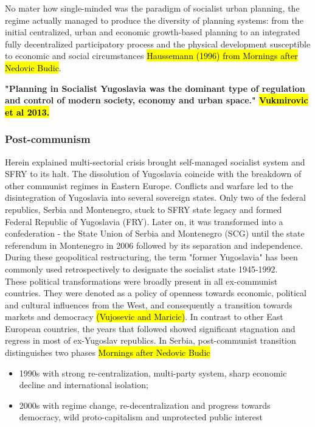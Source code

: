 \documentclass[11pt]{report}
\begin{document}
No mater how single-minded was the  paradigm of socialist urban planning, the regime actually managed to produce the diversity of planning systems: from the initial centralized, urban and economic growth-based planning to an integrated fully decentralized participatory process and the physical development susceptible to economic and social circumstances \hl{Haussemann (1996) from Mornings after Nedovic Budic}.

\textbf{"Planning  in  Socialist  Yugoslavia  was  the  dominant  type  of  regulation  and  control  of  modern  society, economy and urban space." \hl{Vukmirovic et al 2013.}}

\subsubsection{Post-communism}

Herein explained multi-sectorial crisis brought self-managed socialist system and SFRY to its halt. The dissolution of Yugoslavia coincide with the breakdown of other communist regimes in Eastern Europe. Conflicts and warfare led to the disintegration of Yugoslavia into several sovereign states. Only two of the federal republics, Serbia and Montenegro, stuck to SFRY state legacy and formed Federal Republic of Yugoslavia (FRY). Later on, it was transformed into a confederation - the State Union of Serbia and Montenegro (SCG) until the state referendum in Montenegro in 2006 followed by its separation and independence. During these geopolitical restructuring, the term "former Yugoslavia" has been commonly used retrospectively to designate the socialist state 1945-1992.
\\
These political transformations were broadly present in all ex-communist countries. They were denoted as a policy of openness towards economic, political and cultural influences from the West, and consequently a transition towards markets and democracy \hl{(Vujosevic and Maricic)}. In contrast to other East European countries, the years that followed showed significant stagnation and regress in most of ex-Yugoslav republics. In Serbia, post-communist transition distinguishes two phases \hl{Mornings after Nedovic Budic} 
\begin{itemize}
\item 1990s with strong re-centralization, multi-party system, sharp economic decline and international isolation;
\item 2000s with regime change, re-decentralization and progress towards democracy, wild proto-capitalism and unprotected public interest
\end{itemize}       
     
\end{document}
